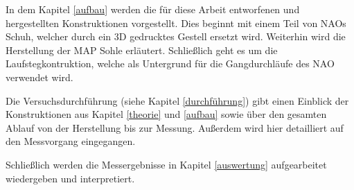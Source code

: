 In dem Kapitel \ref{aufbau} werden die für diese Arbeit entworfenen und hergestellten Konstruktionen vorgestellt. Dies beginnt mit einem Teil von NAOs Schuh, welcher durch ein 3D gedrucktes Gestell ersetzt wird. Weiterhin wird die Herstellung der MAP Sohle erläutert. Schließlich geht es um die Laufstegkontruktion, welche als Untergrund für die Gangdurchläufe des NAO verwendet wird. 

Die Versuchsdurchführung (siehe Kapitel \ref{durchführung}) gibt einen Einblick der Konstruktionen aus Kapitel \ref{theorie} und \ref{aufbau} sowie über den gesamten Ablauf von der Herstellung bis zur Messung. Außerdem wird hier detailliert auf den Messvorgang eingegangen. 

Schließlich werden die Messergebnisse in Kapitel \ref{auswertung} aufgearbeitet wiedergeben und interpretiert. 



